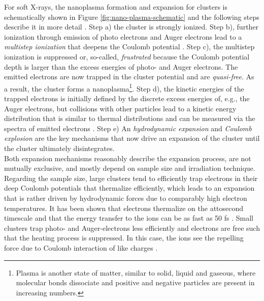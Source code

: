 For soft X-rays, the nanoplasma formation and expansion for clusters is schematically shown in Figure \ref{fig:nano-plasma-schematic} and the following steps describe it in more detail \citep{Arbeiter-2011-NJP,Bostedt-2010-JPB}. Step a) the cluster is strongly ionized. Step b), further ionization through emission of photo electrons and Auger electrons lead to a \textit{multistep ionization} that deepens the Coulomb potential \citep{Wabnitz-2002-Nature,Laarmann-2004-PRL,Bostedt-2008-PRL}. Step c), the multistep ionization is suppressed or, so-called, \textit{frustrated} because the Coulomb potential depth is larger than the excess energies of photo- and Auger electrons. The emitted electrons are now trapped in the cluster potential and are \textit{quasi-free}. As a result, the cluster forms a nanoplasma\footnote{Plasma is another state of matter, similar to solid, liquid and gaseous, where molecular bonds dissociate and positive and negative particles are present in increasing numbers.}. Step d), the kinetic energies of the trapped electrons is initially defined by the discrete excess energies of, e.g., the Auger electrons, but collisions with other particles lead to a kinetic energy distribution that is similar to thermal distributions and can be measured via the spectra of emitted electrons \citep{Laarmann-2005-PRL,Bostedt-2010-NJP}. Step e) An \textit{hydrodynamic expansion} and \textit{Coulomb explosion} are the key mechanisms that now drive an expansion of the cluster until the cluster ultimately disintegrates.\\[1\baselineskip]
%
Both expansion mechanisms reasonably describe the expansion process, are not mutually exclusive, and mostly depend on sample size and irradiation technique. Regarding the sample size, large clusters tend to efficiently trap electrons in their deep Coulomb potentials that thermalize efficiently, which leads to an expansion that is rather driven by hydrodynamic forces due to comparably high electron temperatures. It has been shown that electrons thermalize on the attosecond timescale and that the energy transfer to the ions can be as fast as 50 fs \citep{Arbeiter-2010-PRA}. Small clusters trap photo- and Auger-electrons less efficiently and electrons are free such that the heating process is suppressed. In this case, the ions see the repelling force due to Coulomb interaction of like charges \citep{Lezius-1998-PRL}.\\[1\baselineskip]
%
